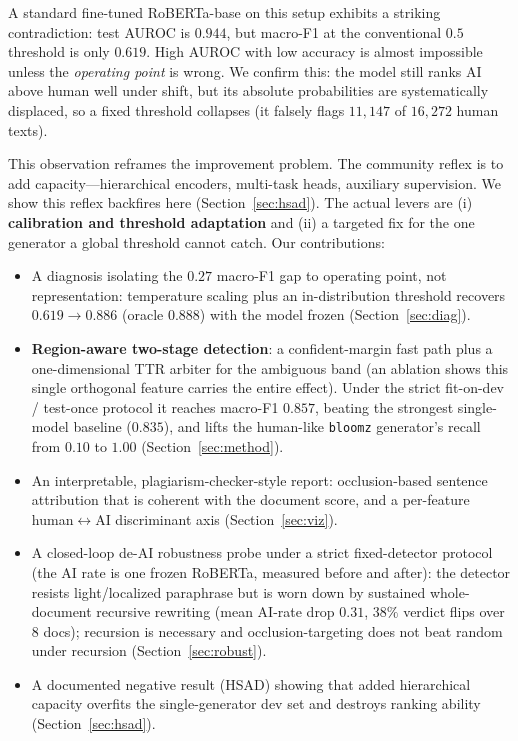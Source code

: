 \documentclass[11pt]{article}
\begin{document}
A standard fine-tuned RoBERTa-base \citep{liu2019roberta} on this setup
exhibits a striking contradiction: test AUROC is $0.944$, but macro-F1 at the
conventional $0.5$ threshold is only $0.619$. High AUROC with low accuracy is
almost impossible unless the \emph{operating point} is wrong. We confirm this:
the model still ranks AI above human well under shift, but its absolute
probabilities are systematically displaced, so a fixed threshold collapses
(it falsely flags $11{,}147$ of $16{,}272$ human texts).

This observation reframes the improvement problem. The community reflex is to
add capacity---hierarchical encoders, multi-task heads, auxiliary
supervision. We show this reflex backfires here (Section~\ref{sec:hsad}). The
actual levers are (i) \textbf{calibration and threshold adaptation} and (ii) a
targeted fix for the one generator a global threshold cannot catch. Our
contributions:

\begin{itemize}\itemsep2pt
\item A diagnosis isolating the $0.27$ macro-F1 gap to operating point, not
representation: temperature scaling plus an in-distribution threshold recovers
$0.619\!\rightarrow\!0.886$ (oracle $0.888$) with the model frozen
(Section~\ref{sec:diag}).
\item \textbf{Region-aware two-stage detection}: a confident-margin fast path
plus a one-dimensional TTR arbiter for the ambiguous band (an ablation shows
this single orthogonal feature carries the entire effect).
Under the strict fit-on-dev / test-once protocol it reaches macro-F1 $0.857$,
beating the strongest single-model baseline ($0.835$), and lifts the
human-like \texttt{bloomz} generator's recall from $0.10$ to $1.00$
(Section~\ref{sec:method}).
\item An interpretable, plagiarism-checker-style report: occlusion-based
sentence attribution that is coherent with the document score, and a
per-feature human$\leftrightarrow$AI discriminant axis (Section~\ref{sec:viz}).
\item A closed-loop de-AI robustness probe under a strict fixed-detector
protocol (the AI rate is one frozen RoBERTa, measured before and after): the
detector resists light/localized paraphrase but is worn down by sustained
whole-document recursive rewriting (mean AI-rate drop $0.31$, $38\%$ verdict
flips over 8 docs); recursion is necessary and occlusion-targeting does not
beat random under recursion (Section~\ref{sec:robust}).
\item A documented negative result (HSAD) showing that added hierarchical
capacity overfits the single-generator dev set and destroys ranking ability
(Section~\ref{sec:hsad}).
\end{itemize}
\end{document}
